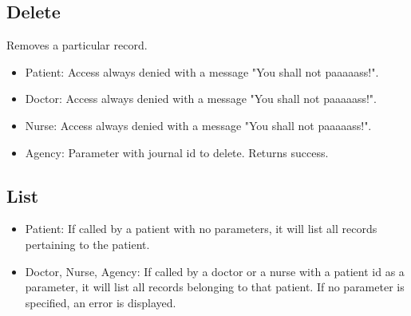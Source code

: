 \documentclass[10pt, a4paper]{article}
\begin{document}
\subsection{Delete}
Removes a particular record.
\begin{itemize}
\item Patient: Access always denied with a message "You shall not paaaaass!".
\item Doctor: Access always denied with a message "You shall not paaaaass!".
\item Nurse: Access always denied with a message "You shall not paaaaass!".
\item Agency: Parameter with journal id to delete. Returns success.
\end{itemize}

\subsection{List}
\begin{itemize}
\item Patient: If called by a patient with no parameters, it will list all records pertaining to the patient.
\item Doctor, Nurse, Agency: If called by a doctor or a nurse with a patient id as a parameter, it will list all records belonging to that patient. If no parameter is specified, an error is displayed.
\end{itemize}
\end{document}
